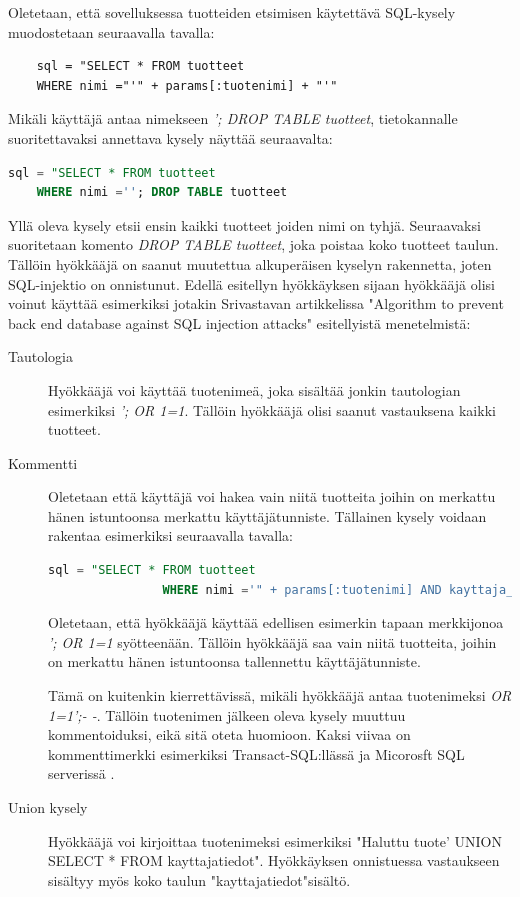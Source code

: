 \documentclass[finnish]{tktltiki2}
\theoremstyle{definition}
\theoremstyle{remark}
\begin{document}
 Oletetaan, että sovelluksessa tuotteiden etsimisen käytettävä SQL-kysely muodostetaan seuraavalla tavalla:
 
	\begin{lstlisting}
	sql = "SELECT * FROM tuotteet
	WHERE nimi ="'" + params[:tuotenimi] + "'"
	\end{lstlisting}
	
	Mikäli käyttäjä antaa nimekseen \textit{'; DROP TABLE tuotteet}, tietokannalle suoritettavaksi annettava kysely näyttää seuraavalta:
	\pagebreak
	
	\begin{lstlisting}[language=sql]
	sql = "SELECT * FROM tuotteet
	WHERE nimi =''; DROP TABLE tuotteet     
	\end{lstlisting}
	
	Yllä oleva kysely etsii ensin kaikki tuotteet joiden nimi on tyhjä. Seuraavaksi suoritetaan komento \textit{DROP TABLE tuotteet}, joka poistaa koko tuotteet taulun. Tällöin hyökkääjä on saanut muutettua alkuperäisen kyselyn rakennetta, joten SQL-injektio on onnistunut. Edellä esitellyn hyökkäyksen sijaan hyökkääjä olisi voinut käyttää esimerkiksi jotakin Srivastavan artikkelissa "Algorithm to prevent back end database against SQL injection attacks"\space \cite{piggy} esitellyistä menetelmistä:  
		\begin{description}
			
		\item[Tautologia] \hfill
		
		Hyökkääjä voi käyttää tuotenimeä, joka sisältää jonkin tautologian esimerkiksi \textit{'; OR 1=1}. Tällöin hyökkääjä olisi saanut vastauksena kaikki tuotteet.
		
		\item[Kommentti] \hfill
		
		Oletetaan että käyttäjä voi hakea vain niitä tuotteita joihin on merkattu hänen istuntoonsa merkattu käyttäjätunniste. Tällainen kysely voidaan rakentaa esimerkiksi seuraavalla tavalla:
			\begin{lstlisting}[language=sql]
				sql = "SELECT * FROM tuotteet
				WHERE nimi ='" + params[:tuotenimi] AND kayttaja_id = session[:kayttaja_id]"'
			\end{lstlisting}
			Oletetaan, että hyökkääjä käyttää edellisen esimerkin tapaan merkkijonoa \textit{'; OR 1=1} syötteenään. Tällöin hyökkääjä saa vain niitä tuotteita, joihin on merkattu hänen istuntoonsa tallennettu käyttäjätunniste. 
			
			Tämä on kuitenkin kierrettävissä, mikäli hyökkääjä antaa tuotenimeksi \textit{OR 1=1';- -}. Tällöin tuotenimen jälkeen oleva kysely muuttuu kommentoiduksi, eikä sitä oteta huomioon. Kaksi viivaa on kommenttimerkki esimerkiksi Transact-SQL:llässä ja Micorosft SQL serverissä \cite{sqlids}.
			
		\item[Union kysely] \hfill
		
		Hyökkääjä voi kirjoittaa tuotenimeksi esimerkiksi "Haluttu tuote' UNION SELECT * FROM kayttajatiedot". Hyökkäyksen onnistuessa vastaukseen sisältyy myös koko taulun "kayttajatiedot"\space sisältö.
	\end{description}
	
\end{document}
